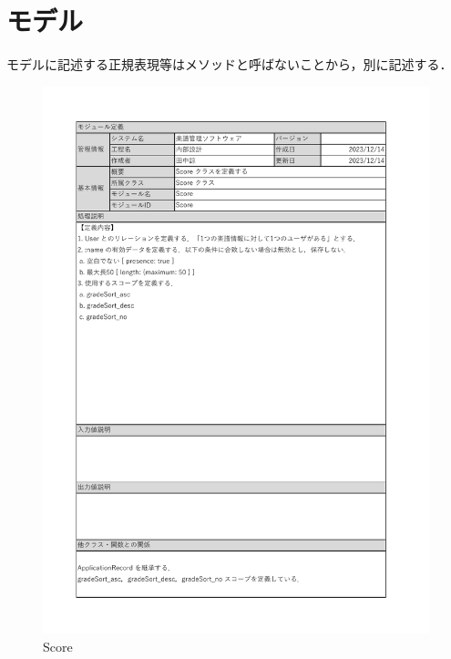 \section{モデル}
モデルに記述する正規表現等はメソッドと呼ばないことから，別に記述する．
\begin{figure}[H]
    \centering
    \includegraphics[scale=0.5]{img/Model/Score.pdf}
    \caption{Score}
\end{figure}
